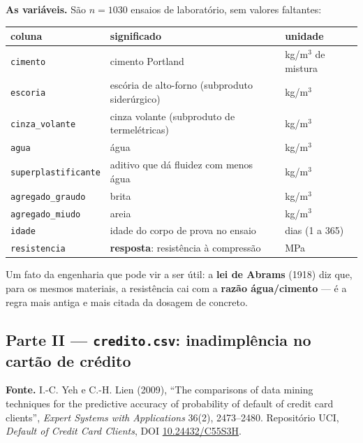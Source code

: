 \documentclass[11pt,a4paper]{article}
\newcommand{\cod}[1]{\texttt{#1}}
\begin{document}
\medskip\noindent\textbf{As variáveis.} São $n=1030$ ensaios de laboratório, sem
valores faltantes:
\begin{center}\small
\renewcommand{\arraystretch}{1.2}
\begin{tabular}{@{}lll@{}}
\toprule
\textbf{coluna} & \textbf{significado} & \textbf{unidade} \\
\midrule
\cod{cimento}            & cimento Portland                               & kg/m$^3$ de mistura \\
\cod{escoria}            & escória de alto-forno (subproduto siderúrgico)  & kg/m$^3$ \\
\cod{cinza\_volante}     & cinza volante (subproduto de termelétricas)    & kg/m$^3$ \\
\cod{agua}               & água                                           & kg/m$^3$ \\
\cod{superplastificante} & aditivo que dá fluidez com menos água          & kg/m$^3$ \\
\cod{agregado\_graudo}   & brita                                          & kg/m$^3$ \\
\cod{agregado\_miudo}    & areia                                          & kg/m$^3$ \\
\cod{idade}              & idade do corpo de prova no ensaio              & dias (1 a 365) \\
\midrule
\cod{resistencia}        & \textbf{resposta}: resistência à compressão    & MPa \\
\bottomrule
\end{tabular}
\end{center}

\noindent
Um fato da engenharia que pode vir a ser útil: a \textbf{lei de Abrams} (1918) diz que, para
os mesmos materiais, a resistência cai com a \textbf{razão água/cimento} --- é a
regra mais antiga e mais citada da dosagem de concreto.

\subsection{Parte II --- \texttt{credito.csv}: inadimplência no cartão de crédito}

\noindent\textbf{Fonte.} I.-C. Yeh e C.-H. Lien (2009), ``The comparisons of data
mining techniques for the predictive accuracy of probability of default of credit
card clients'', \emph{Expert Systems with Applications} 36(2), 2473--2480.
Repositório UCI, \emph{Default of Credit Card Clients}, DOI
\href{https://doi.org/10.24432/C55S3H}{10.24432/C55S3H}.
\end{document}
